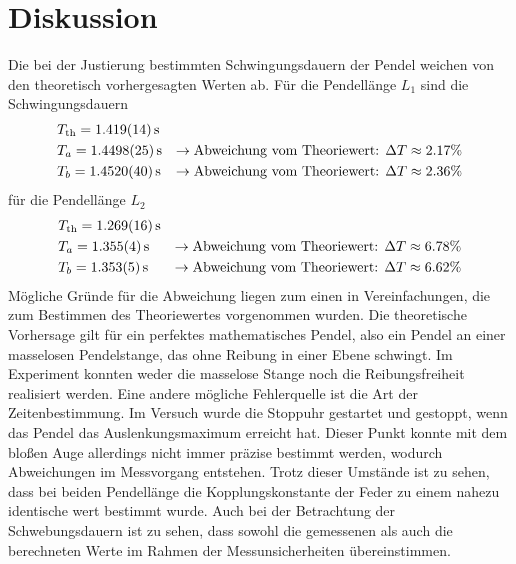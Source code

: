 \section{Diskussion}

Die bei der Justierung bestimmten Schwingungsdauern der Pendel weichen von den theoretisch vorhergesagten Werten ab.
Für die Pendellänge $L_1$ sind die Schwingungsdauern
\begin{align*}
    & T_\text{th} = \SI{1.419 +- 0.014}{s} & \\
    & T_a = \SI{1.4498 +- 0.0025}{s} & \rightarrow \text{Abweichung vom Theoriewert: } \Delta T \approx 2.17 \% \\
    & T_b = \SI{1.4520 +- 0.0040}{s} & \rightarrow \text{Abweichung vom Theoriewert: } \Delta T \approx 2.36 \%
\end{align*}
für die Pendellänge $L_2$
\begin{align*}
    & T_\text{th} = \SI{1.269 +- 0.016}{s} & \\
    & T_a = \SI{1.355 +- 0.004}{s} & \rightarrow \text{Abweichung vom Theoriewert: } \Delta T \approx 6.78 \% \\
    & T_b = \SI{1.353 +- 0.005}{s} & \rightarrow \text{Abweichung vom Theoriewert: } \Delta T \approx 6.62 \%
\end{align*}
Mögliche Gründe für die Abweichung liegen zum einen in Vereinfachungen, die zum Bestimmen des Theoriewertes vorgenommen wurden. Die theoretische Vorhersage gilt für ein perfektes 
mathematisches Pendel, also ein Pendel an einer masselosen Pendelstange, das ohne Reibung in einer Ebene schwingt. Im Experiment konnten weder die masselose Stange noch die 
Reibungsfreiheit realisiert werden. Eine andere mögliche Fehlerquelle ist die Art der Zeitenbestimmung. Im Versuch wurde die Stoppuhr gestartet und gestoppt, wenn das Pendel 
das Auslenkungsmaximum erreicht hat. Dieser Punkt konnte mit dem bloßen Auge allerdings nicht immer präzise bestimmt werden, wodurch Abweichungen im Messvorgang entstehen. Trotz 
dieser Umstände ist zu sehen, dass bei beiden Pendellänge die Kopplungskonstante der Feder zu einem nahezu identische wert bestimmt wurde. Auch bei der Betrachtung der 
Schwebungsdauern ist zu sehen, dass sowohl die gemessenen als auch die berechneten Werte im Rahmen der Messunsicherheiten übereinstimmen.